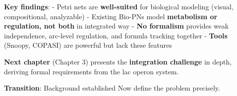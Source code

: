 \textbf{Key findings}: - Petri nets are \textbf{well-suited} for
biological modeling (visual, compositional, analyzable) - Existing
Bio-PNs model \textbf{metabolism or regulation, not both} in integrated
way - \textbf{No formalism} provides weak independence, arc-level
regulation, and formula tracking together - \textbf{Tools} (Snoopy,
COPASI) are powerful but lack these features

\textbf{Next chapter} (Chapter 3) presents the \textbf{integration
challenge} in depth, deriving formal requirements from the lac operon
system.

\textbf{Transition}: Background established \textrightarrow Now define the problem
precisely.
